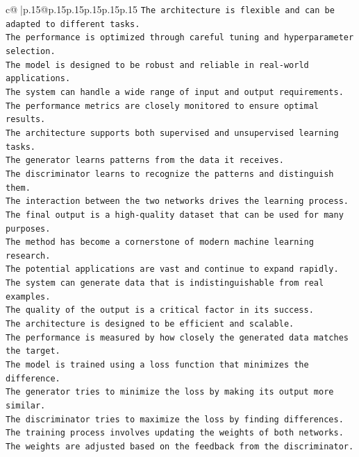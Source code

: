 \documentclass{article}
\begin{document}
{\begin{supertabular}{c@{$\;$}|p{.15\linewidth}@{}p{.15\linewidth}p{.15\linewidth}p{.15\linewidth}p{.15\linewidth}p{.15\linewidth}}
{{{\texttt{The architecture is flexible and can be adapted to different tasks.  } \\
\texttt{The performance is optimized through careful tuning and hyperparameter selection.  } \\
\texttt{The model is designed to be robust and reliable in real{-}world applications.  } \\
\texttt{The system can handle a wide range of input and output requirements.  } \\
\texttt{The performance metrics are closely monitored to ensure optimal results.  } \\
\texttt{The architecture supports both supervised and unsupervised learning tasks.  } \\
\texttt{The generator learns patterns from the data it receives.  } \\
\texttt{The discriminator learns to recognize the patterns and distinguish them.  } \\
\texttt{The interaction between the two networks drives the learning process.  } \\
\texttt{The final output is a high{-}quality dataset that can be used for many purposes.  } \\
\texttt{The method has become a cornerstone of modern machine learning research.  } \\
\texttt{The potential applications are vast and continue to expand rapidly.  } \\
\texttt{The system can generate data that is indistinguishable from real examples.  } \\
\texttt{The quality of the output is a critical factor in its success.  } \\
\texttt{The architecture is designed to be efficient and scalable.  } \\
\texttt{The performance is measured by how closely the generated data matches the target.  } \\
\texttt{The model is trained using a loss function that minimizes the difference.  } \\
\texttt{The generator tries to minimize the loss by making its output more similar.  } \\
\texttt{The discriminator tries to maximize the loss by finding differences.  } \\
\texttt{The training process involves updating the weights of both networks.  } \\
\texttt{The weights are adjusted based on the feedback from the discriminator.  } \\
}}}
\end{supertabular}}
\end{document}
